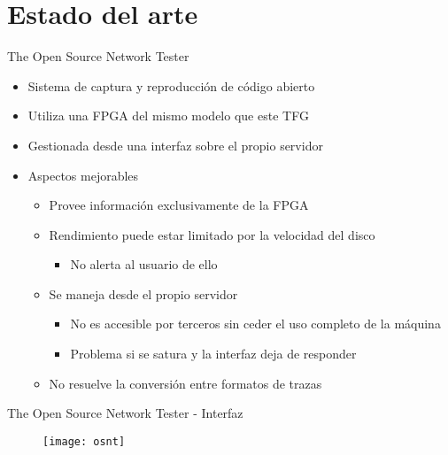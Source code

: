 \section{Estado del arte}

\begin{frame}{The Open Source Network Tester}
  \begin{itemize}
    \item Sistema de captura y reproducción de código abierto
    \item Utiliza una FPGA del mismo modelo que este TFG
    \item Gestionada desde una interfaz sobre el propio servidor
    \item Aspectos mejorables
    \begin{itemize}
      \item Provee información exclusivamente de la FPGA
      \item Rendimiento puede estar limitado por la velocidad del disco
      \begin{itemize}
        \item No alerta al usuario de ello
      \end{itemize}
      \item Se maneja desde el propio servidor
      \begin{itemize}
        \item No es accesible por terceros sin ceder el uso completo de la máquina
        \item Problema si se satura y la interfaz deja de responder
      \end{itemize}
      \item No resuelve la conversión entre formatos de trazas
    \end{itemize}
  \end{itemize}
\end{frame}

\begin{frame}{The Open Source Network Tester - Interfaz}
  \begin{figure}
    \texttt{[image: osnt]}
  \end{figure}
\end{frame}
